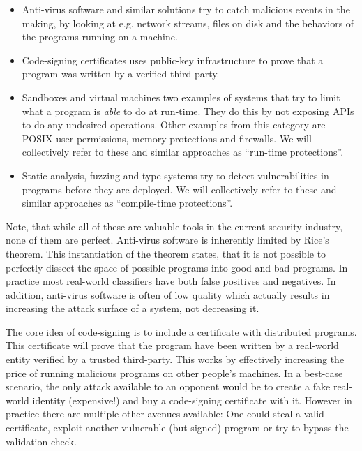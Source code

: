 \begin{itemize}
\item Anti-virus software and similar solutions try to catch malicious events in
  the making, by looking at e.g. network streams, files on disk and the
  behaviors of the programs running on a machine.
\item Code-signing certificates uses public-key infrastructure to prove that a
  program was written by a verified third-party.
\item Sandboxes and virtual machines two examples of systems that try to limit
  what a program is \emph{able} to do at run-time. They do this by not exposing
  APIs to do any undesired operations. Other examples from this category are
  POSIX user permissions, memory protections and firewalls. We will collectively
  refer to these and similar approaches as ``run-time protections''.
\item Static analysis, fuzzing and type systems try to detect vulnerabilities in
  programs before they are deployed. We will collectively refer to these and
  similar approaches as ``compile-time protections''.
\end{itemize}

Note, that while all of these are valuable tools in the current security
industry, none of them are perfect. Anti-virus software is inherently limited by
Rice's theorem. This instantiation of the theorem states, that it is not
possible to perfectly dissect the space of possible programs into good and bad
programs. In practice most real-world classifiers have both false positives and
negatives. In addition, anti-virus software is often of low quality which
actually results in increasing the attack surface of a system, not decreasing
it.

The core idea of code-signing is to include a certificate with distributed
programs. This certificate will prove that the program have been written by a
real-world entity verified by a trusted third-party. This works by effectively
increasing the price of running malicious programs on other people's
machines. In a best-case scenario, the only attack available to an opponent
would be to create a fake real-world identity (expensive!) and buy a
code-signing certificate with it. However in practice there are multiple other
avenues available: One could steal a valid certificate, exploit another
vulnerable (but signed) program or try to bypass the validation check.

